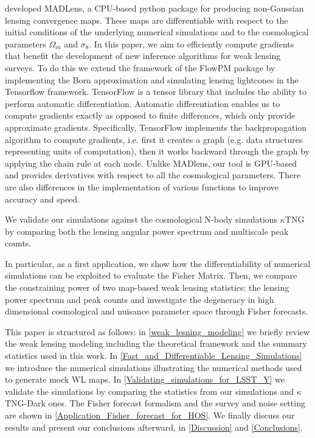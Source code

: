 \documentclass{aa}
\begin{document}
\cite{bohm2021madlens} developed MADLens, a CPU-based python package for producing non-Gaussian lensing convergence maps. These maps are differentiable with respect to the initial conditions of the underlying numerical simulations and to the cosmological parameters $\Omega_m$ and $\sigma_8$. In this paper,  we aim to efficiently compute gradients that benefit the development of new inference algorithms for weak lensing surveys. To do this we extend the framework of the FlowPM package \cite{modi2021flowpm} by implementing the Born approximation and simulating lensing lightcones in the Tensorflow framework. TensorFlow is a tensor library that includes the ability to perform automatic differentiation. Automatic differentiation enables us to compute gradients exactly as opposed to finite differences, which only provide approximate gradients. Specifically, TensorFlow implements the backpropagation algorithm to compute gradients, i.e. first it creates a graph (e.g. data structures representing units of computation), then it works backward through the graph by applying the chain rule at each node. Unlike MADlens, our tool is GPU-based and provides derivatives with respect to all the cosmological parameters. There are also differences in the implementation of various functions to improve accuracy and speed.

We validate our simulations against the cosmological N-body simulations $\kappa$TNG \citep{osato2021kappatng} by comparing both the lensing angular power spectrum and multiscale peak counts.

In particular, as a first application, we show how the differentiability of numerical simulations can be exploited to evaluate the Fisher Matrix. Then, we compare the constraining power of two map-based weak lensing statistics: the lensing power spectrum and peak counts and investigate the degeneracy in high dimensional cosmological and nuisance parameter space through Fisher forecasts. 

This paper is structured as follows: in \ref{weak_lesning_modeling} we briefly review the weak lensing modeling including the theoretical framework and the summary statistics used in this work. In \autoref{Fast_and_Differentiable_Lensing_Simulations} we introduce the numerical simulations illustrating the numerical methods used to generate mock WL maps. In \autoref{Validating_simulations_for_LSST_Y} we validate the simulations by comparing the statistics from our simulations and $\kappa$TNG-Dark ones.
The Fisher forecast formalism and the survey and noise setting are shown in \autoref{Application_Fisher_forecast_for_HOS}. We finally discuss our results and present our conclusions afterward, in \autoref{Discussion} and \autoref{Conclusions}.
\end{document}
